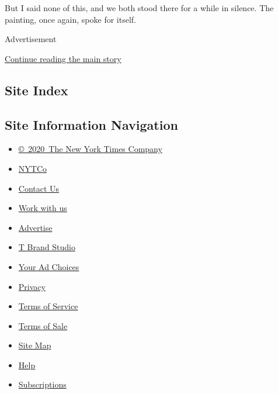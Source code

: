 But I said none of this, and we both stood there for a while in silence.
The painting, once again, spoke for itself.

Advertisement

\protect\hyperlink{after-bottom}{Continue reading the main story}

\hypertarget{site-index}{%
\subsection{Site Index}\label{site-index}}

\hypertarget{site-information-navigation}{%
\subsection{Site Information
Navigation}\label{site-information-navigation}}

\begin{itemize}
\tightlist
\item
  \href{https://help.nytimes.com/hc/en-us/articles/115014792127-Copyright-notice}{©~2020~The
  New York Times Company}
\end{itemize}

\begin{itemize}
\tightlist
\item
  \href{https://www.nytco.com/}{NYTCo}
\item
  \href{https://help.nytimes.com/hc/en-us/articles/115015385887-Contact-Us}{Contact
  Us}
\item
  \href{https://www.nytco.com/careers/}{Work with us}
\item
  \href{https://nytmediakit.com/}{Advertise}
\item
  \href{http://www.tbrandstudio.com/}{T Brand Studio}
\item
  \href{https://www.nytimes.com/privacy/cookie-policy\#how-do-i-manage-trackers}{Your
  Ad Choices}
\item
  \href{https://www.nytimes.com/privacy}{Privacy}
\item
  \href{https://help.nytimes.com/hc/en-us/articles/115014893428-Terms-of-service}{Terms
  of Service}
\item
  \href{https://help.nytimes.com/hc/en-us/articles/115014893968-Terms-of-sale}{Terms
  of Sale}
\item
  \href{https://spiderbites.nytimes.com}{Site Map}
\item
  \href{https://help.nytimes.com/hc/en-us}{Help}
\item
  \href{https://www.nytimes.com/subscription?campaignId=37WXW}{Subscriptions}
\end{itemize}
